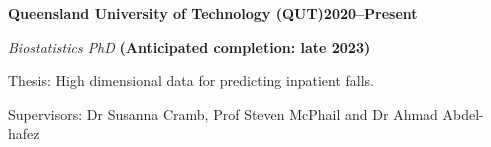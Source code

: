 \textbf{Queensland University of Technology (QUT)\hfill 2020--Present} \par
\textit{Biostatistics PhD} \hfill\textbf{(Anticipated completion: late 2023)} \par
Thesis: High dimensional data for predicting inpatient falls.\par
Supervisors: Dr Susanna Cramb, Prof Steven McPhail and Dr Ahmad Abdel-hafez\par